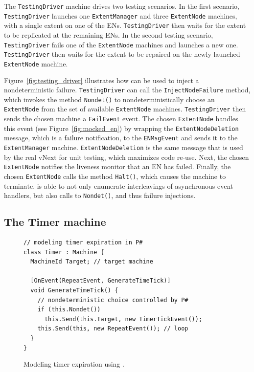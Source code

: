 The \texttt{TestingDriver} machine drives two testing scenarios. In the first scenario, \texttt{TestingDriver} launches one \texttt{ExtentManager} and three \texttt{ExtentNode} machines, with a single extent on one of the ENs. \texttt{TestingDriver} then waits for the extent to be replicated at the remaining ENs. In the second testing scenario, \texttt{TestingDriver} fails one of the \texttt{ExtentNode} machines and launches a new one. \texttt{TestingDriver} then waits for the extent to be repaired on the newly launched \texttt{ExtentNode} machine.

Figure~\ref{fig:testing_driver} illustrates how \psharp can be used to inject a nondeterministic failure. \texttt{TestingDriver} can call the \texttt{InjectNodeFailure} method, which invokes the \psharp method \texttt{Nondet()} to nondeterministically choose an \texttt{ExtentNode} from the set of available \texttt{ExtentNode} machines. \texttt{TestingDriver} then sends the chosen machine a \texttt{FailEvent} event. The chosen \texttt{ExtentNode} handles this event (see Figure~\ref{fig:mocked_en}) by wrapping the \texttt{ExtentNodeDeletion} message, which is a failure notification, to the \texttt{ENMsgEvent} and sends it to the \texttt{ExtentManager} machine. \texttt{ExtentNodeDeletion} is the same message that is used by the real vNext for unit testing, which maximizes code re-use. Next, the chosen \texttt{ExtentNode} notifies the liveness monitor that an EN has failed. Finally, the chosen \texttt{ExtentNode} calls the \psharp method \texttt{Halt()}, which causes the machine to terminate. \psharp is able to not only enumerate interleavings of asynchronous event handlers, but also calls to \texttt{Nondet()}, and thus failure injections.

\subsection{The Timer machine}
\label{sec:method:timer}

\begin{figure}[t]
\begin{lstlisting}
// modeling timer expiration in P#
class Timer : Machine {
  MachineId Target; // target machine

  [OnEvent(RepeatEvent, GenerateTimeTick)]
  void GenerateTimeTick() {
    // nondeterministic choice controlled by P#
    if (this.Nondet())
      this.Send(this.Target, new TimerTickEvent());
    this.Send(this, new RepeatEvent()); // loop
  }
}
\end{lstlisting}
\vspace{-3mm}
\caption{Modeling timer expiration using \psharp.}
\label{fig:mocked_timer}
\vspace{-2mm}
\end{figure}

